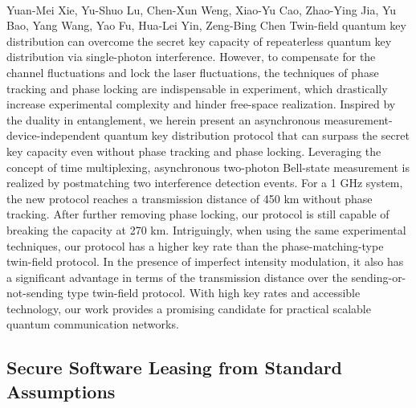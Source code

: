 \documentclass{article}%
\begin{document}
\paragraph{}%
Yuan{-}Mei Xie, Yu{-}Shuo Lu, Chen{-}Xun Weng, Xiao{-}Yu Cao, Zhao{-}Ying Jia, Yu Bao, Yang Wang, Yao Fu, Hua{-}Lei Yin, Zeng{-}Bing Chen%
Twin-field quantum key distribution can overcome the secret key capacity of repeaterless quantum key distribution via single-photon interference. However, to compensate for the channel fluctuations and lock the laser fluctuations, the techniques of phase tracking and phase locking are indispensable in experiment, which drastically increase experimental complexity and hinder free-space realization. Inspired by the duality in entanglement, we herein present an asynchronous measurement-device-independent quantum key distribution protocol that can surpass the secret key capacity even without phase tracking and phase locking. Leveraging the concept of time multiplexing, asynchronous two-photon Bell-state measurement is realized by postmatching two interference detection events. For a 1 GHz system, the new protocol reaches a transmission distance of 450 km without phase tracking. After further removing phase locking, our protocol is still capable of breaking the capacity at 270 km. Intriguingly, when using the same experimental techniques, our protocol has a higher key rate than the phase-matching-type twin-field protocol. In the presence of imperfect intensity modulation, it also has a significant advantage in terms of the transmission distance over the sending-or-not-sending type twin-field protocol. With high key rates and accessible technology, our work provides a promising candidate for practical scalable quantum communication networks.

%
\subsection{Secure Software Leasing from Standard Assumptions}%
\label{subsec:SecureSoftwareLeasingfromStandardAssumptions}%
\end{document}
